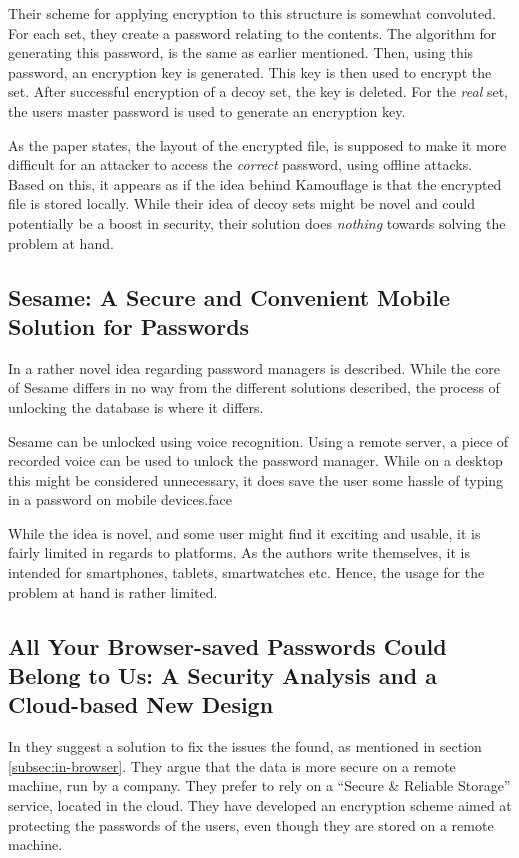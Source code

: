			Their scheme for applying encryption to this structure is somewhat convoluted. For each set, they create a password relating to the contents. The algorithm for generating this password, is the same as earlier mentioned. Then, using this password, an encryption key is generated. This key is then used to encrypt the set. After successful encryption of a decoy set, the key is deleted. For the \emph{real} set, the users master password is used to generate an encryption key.

			As the paper states, the layout of the encrypted file, is supposed to make it more difficult for an attacker to access the \emph{correct} password, using offline attacks. Based on this, it appears as if the idea behind Kamouflage is that the encrypted file is stored locally. While their idea of decoy sets might be novel and could potentially be a boost in security, their solution does \emph{nothing} towards solving the problem at hand.

		\subsection*{Sesame: A Secure and Convenient Mobile Solution for Passwords}
			In \cite{sesame} a rather novel idea regarding password managers is described. While the core of Sesame differs in no way from the different solutions described, the process of unlocking the database is where it differs.

			Sesame can be unlocked using voice recognition. Using a remote server, a piece of recorded voice can be used to unlock the password manager. While on a desktop this might be considered unnecessary, it does save the user some hassle of typing in a password on mobile devices.face

			While the idea is novel, and some user might find it exciting and usable, it is fairly limited in regards to platforms. As the authors write themselves, it is intended for smartphones, tablets, smartwatches etc. Hence, the usage for the problem at hand is rather limited.

		\subsection*{All Your Browser-saved Passwords Could Belong to Us: A Security Analysis and a Cloud-based New Design}
			In \cite{browser_saved} they suggest a solution to fix the issues the found, as mentioned in section \ref{subsec:in-browser}. They argue that the data is more secure on a remote machine, run by a company. They prefer to rely on a ``Secure \& Reliable Storage'' service, located in the cloud. They have developed an encryption scheme aimed at protecting the passwords of the users, even though they are stored on a remote machine. 

